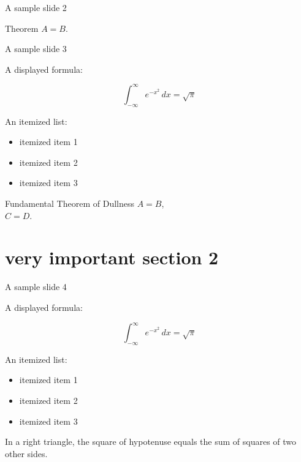 \documentclass[final,serif,hyperref={pdfpagelabels=false}]{beamer}
\begin{document}
{\begin{frame}{A sample slide 2}
\begin{beamerboxesrounded}[upper=uppercol,lower=lowercol,shadow=true]{Theorem}
$A = B$.
\end{beamerboxesrounded}

\end{frame}

\begin{frame}{A sample slide 3}

A displayed formula:

\[
  \int_{-\infty}^\infty e^{-x^2} \, dx = \sqrt{\pi}
\]

An itemized list:

\begin{itemize}
  \item itemized item 1
  \item itemized item 2
  \item itemized item 3
\end{itemize}

%
%
\begin{beamerboxesrounded}[upper=uppercol,lower=lowercol,shadow=true]
{Fundamental Theorem of Dullness}
$A = B$,\\
$C = D$.
\end{beamerboxesrounded}

\end{frame}

\section{very important section 2}

\begin{frame}{A sample slide 4}

A displayed formula:

\[
  \int_{-\infty}^\infty e^{-x^2} \, dx = \sqrt{\pi}
\]

An itemized list:

\begin{itemize}
  \item itemized item 1
  \item itemized item 2
  \item itemized item 3
\end{itemize}

\begin{theorem}
  In a right triangle, the square of hypotenuse equals
  the sum of squares of two other sides.
\end{theorem}


\end{frame}}
\end{document}
